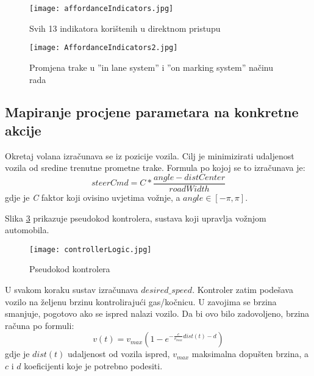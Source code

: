 \documentclass[seminar, utf8, numeric]{fer}
\begin{document}
\begin{figure}[ht]
\centering
\texttt{[image: affordanceIndicators.jpg]}
\caption{Svih 13 indikatora korištenih u direktnom pristupu \cite{deepDrive}}
\label{fig:affordance_inidicators}
\end{figure}

\begin{figure}[htp]
\centering
\texttt{[image: AffordanceIndicators2.jpg]}
\caption{Promjena trake u ''in lane system'' i ''on marking system'' načinu rada \cite{deepDrive}}
\label{fig:promjena_trake}
\end{figure}

\subsection{Mapiranje procjene parametara na konkretne akcije}
Okretaj volana izračunava se iz pozicije vozila. Cilj je minimizirati udaljenost vozila od sredine trenutne prometne trake. Formula po kojoj se to izračunava je:
\begin{equation}
	steerCmd = C*\frac{angle - distCenter}{roadWidth}
\end{equation}
gdje je \textit{C} faktor koji ovisino uvjetima vožnje, a $\textit{angle} \in [-\pi, \pi]$.

\noindent
Slika \ref{fig:controller_logic} prikazuje pseudokod kontrolera, sustava koji upravlja vožnjom automobila.\\

\pagebreak
\begin{figure}[htp]
\centering
\texttt{[image: controllerLogic.jpg]}
\caption{Pseudokod kontrolera \cite{deepDrive}}
\label{fig:controller_logic}
\end{figure}

U svakom koraku sustav izračunava $desired\_speed$. Kontroler zatim podešava vozilo na željenu brzinu kontrolirajući gas/kočnicu. U zavojima se brzina smanjuje, pogotovo ako se ispred nalazi vozilo. Da bi ovo bilo zadovoljeno, brzina računa po formuli:
\begin{equation}
	v(t) = v_{max}(1-e^{-\frac{c}{v_{max}}dist(t) - d})
\end{equation} 
gdje je $dist(t)$ udaljenost od vozila ispred, $v_{max}$ maksimalna dopušten brzina, a $c$ i $d$ koeficijenti koje je potrebno podesiti.

\pagebreak
\end{document}
